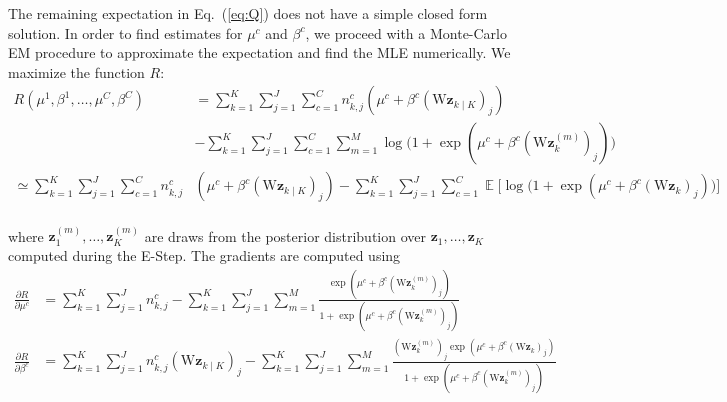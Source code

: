 \documentclass{article}
\DeclareMathOperator{\E}{\mathbb{E}}
\def\*#1{\mathbf{#1}}
\begin{document}
The remaining expectation in Eq.~(\ref{eq:Q}) does not have a simple closed form
solution. In order to find estimates for $\mu^c$ and $\beta^c$, we proceed with
a Monte-Carlo EM procedure to approximate the expectation and find the MLE
numerically. We maximize the function $R$:
\begin{equation}
   \begin{split}
      R(\mu^1, \beta^1, \ldots, \mu^C, \beta^C) &= \sum_{k=1}^K \sum_{j=1}^J \sum_{c=1}^C n_{k,j}^c (\mu^c + \beta^c (\text{W}\*z_{k \mid K})_j) \\
      &- \sum_{k=1}^K \sum_{j=1}^J \sum_{c=1}^C \sum_{m=1}^M \log \big(1 + \exp( \mu^c + \beta^c (\text{W} \*z_k^{(m)})_j ) \big) \\
      \simeq \sum_{k=1}^K \sum_{j=1}^J \sum_{c=1}^C n_{k,j}^c &(\mu^c + \beta^c (\text{W}\*z_{k \mid K})_j) 
         - \sum_{k=1}^K \sum_{j=1}^J \sum_{c=1}^C \E \Big[ \log \big(1 + \exp( \mu^c + \beta^c (\text{W} \*z_k)_j ) \big) \Big ]\\
   \end{split}
\end{equation}

\noindent where $\*z_1^{(m)}, \ldots, \*z_K^{(m)}$ are draws from the posterior
distribution over $\*z_1, \ldots, \*z_K$ computed during the E-Step. The gradients are computed using
\begin{equation}
   \begin{split}
      \frac{\partial R}{\partial \mu^c} &= \sum_{k=1}^K \sum_{j=1}^J n_{k,j}^c 
         - \sum_{k=1}^K \sum_{j=1}^J \sum_{m=1}^M \frac{\exp( \mu^c + \beta^c (\text{W} \*z_k^{(m)})_j )}{1 + \exp( \mu^c + \beta^c (\text{W} \*z_k^{(m)})_j ) } \\
      \frac{\partial R}{\partial \beta^c} &= \sum_{k=1}^K \sum_{j=1}^J n_{k,j}^c(\text{W} \*z_{k \mid K})_j 
         - \sum_{k=1}^K \sum_{j=1}^J \sum_{m=1}^M \frac{(\text{W} \*z_k^{(m)})_j \exp( \mu^c + \beta^c (\text{W} \*z_k)_j )}{1 + \exp( \mu^c + \beta^c (\text{W} \*z_k^{(m)})_j ) } \\
   \end{split}
\end{equation}





\newpage


\end{document}
